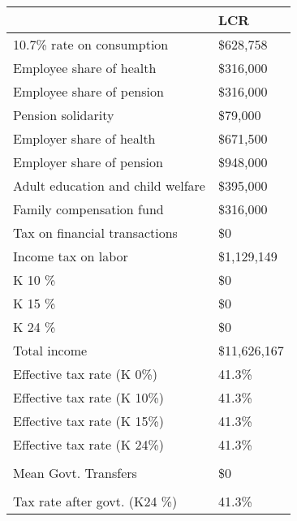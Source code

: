 \documentclass[12pt]{article}
\begin{document}
\begin{table}[]
\label{tab:tcity}
\footnotesize
\begin{tabular}{ll} \hline
&LCR                                             \\ \hline
10.7\% rate on consumption        & \$628,758    \\
Employee share of health          & \$316,000    \\
Employee share of pension         & \$316,000    \\
Pension solidarity                & \$79,000     \\
Employer share of health          & \$671,500    \\
Employer share of pension         & \$948,000    \\
Adult education and child welfare & \$395,000    \\
Family compensation fund          & \$316,000    \\
Tax on financial transactions     & \$0          \\
Income tax on labor               & \$1,129,149  \\
K 10 \%                           & \$0          \\
K 15 \%                           & \$0          \\
K 24 \%                           & \$0          \\
Total income                      & \$11,626,167 \\
Effective tax rate (K 0\%)        & 41.3\%       \\
Effective tax rate (K 10\%)       & 41.3\%       \\
Effective tax rate (K 15\%)       & 41.3\%       \\
Effective tax rate (K 24\%)       & 41.3\%       \\
                                  &              \\
Mean Govt. Transfers              & \$0          \\
                                  &              \\
Tax rate after govt. (K24 \%)     & 41.3\%      \\ \hline
\end{tabular}
\end{table}
\end{document}
